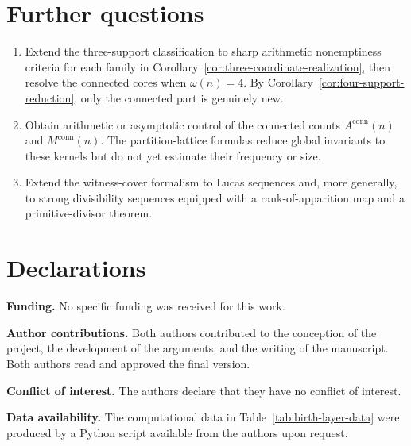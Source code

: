 \documentclass[11pt,letterpaper]{article}
\numberwithin{equation}{section}
\theoremstyle{plain}
\theoremstyle{definition}
\theoremstyle{remark}
\begin{document}
\section{Further questions}\label{sec:questions}

\begin{enumerate}[label=(\arabic*)]
\item Extend the three-support classification to sharp arithmetic
nonemptiness criteria for each family in
Corollary~\ref{cor:three-coordinate-realization}, then resolve the connected
cores when $\omega(n)=4$. By
Corollary~\ref{cor:four-support-reduction}, only the connected part is
genuinely new.
\item Obtain arithmetic or asymptotic control of the connected counts
$A^{\mathrm{conn}}(n)$ and $M^{\mathrm{conn}}(n)$. The partition-lattice
formulas reduce global invariants to these kernels but do not yet estimate
their frequency or size.
\item Extend the witness-cover formalism to Lucas sequences and, more
generally, to strong divisibility sequences equipped with a
rank-of-apparition map and a primitive-divisor theorem.
\end{enumerate}

\section*{Declarations}

\noindent\textbf{Funding.} No specific funding was received for this work.

\smallskip
\noindent\textbf{Author contributions.} Both authors contributed to the
conception of the project, the development of the arguments, and the writing
of the manuscript. Both authors read and approved the final version.

\smallskip
\noindent\textbf{Conflict of interest.} The authors declare that they have no
conflict of interest.

\smallskip
\noindent\textbf{Data availability.} The computational data in
Table~\ref{tab:birth-layer-data} were produced by a Python script available
from the authors upon request.



\end{document}
